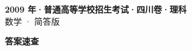 \documentclass[zihao=-4, a4paper]{ctexart}
\begin{document}
\begin{center}
  {\Large\bfseries 2009 年·普通高等学校招生考试·四川卷·理科}\\[4pt]
  {\large 数学 · 简答版}
\end{center}
\medskip
{}

\clearpage
{}
\begin{center}{\Large\bfseries 答案速查}\end{center}
\medskip

\end{document}
